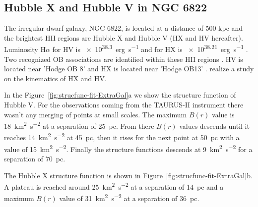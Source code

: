 \documentclass[fleqn,usenatbib, useAMS, a4paper]{mnras}
\newcommand\pos{\ensuremath{_{\mathrm{pos}}}}
\newcommand\ha{\ensuremath{\text{H}\alpha}}
\begin{document}
\subsection{Hubble X and Hubble V in NGC 6822}
\label{sec:6822-hubble}
%
The irregular dwarf galaxy, NGC 6822, is located at a distance of 500 kpc \citetext{\SI{1}{\arcsecond} = \SI{2.42}{pc} ; \citealp{2012A&A...540A.135S}} and the brightest HII regions are Hubble X and Hubble V (HX and HV hereafter). %
Luminosity \ha{} for HV is \SI{e38.3}{erg.s^{-1}} and for HX is \SI{e38.21}{erg.s^{-1}} \citep{2002MNRAS.329..481B}.
Two recognized OB associations are identified within these HII regions \citep{1991ApJ...379..621H,1992AJ....104.1374W}.
HV is located near 'Hodge OB 8' and HX is located near 'Hodge OB13'  \citep{1999PASP..111.1382O}.
\citet{1993PASJ...45..693T} realize a study on the kinematics of HX and HV. 


In the Figure~\ref{fig:strucfunc-fit-ExtraGal}a we show the structure function of Hubble V.
For the observations coming from the TAURUS-II instrument there wasn't any merging of points at small scales.
The maximum \(B(r)\) value is \SI{18}{km^{2}.s^{-2}} at a separation of \SI{25}{pc}. 
From there \(B(r)\) values descends until it reaches \SI{14}{km^{2}.s^{-2}} at \SI{45}{pc}, then it rises for the next point at \SI{50}{pc} with a value of \SI{15}{km^{2}.s^{-2}}.
Finally the structure functions descends at \SI{9}{km^{2}.s^{-2}} for a separation of \SI{70}{pc}.

The Hubble X structure function is shown in Figure~\ref{fig:strucfunc-fit-ExtraGal}b.
A plateau is reached around \SI{25}{km^{2}.s^{-2}} at a separation of \SI{14}{pc} and a maximum \(B(r)\) value of \SI{31}{km^{2}.s^{-2}} at a separation of \SI{36}{pc}.
\end{document}
